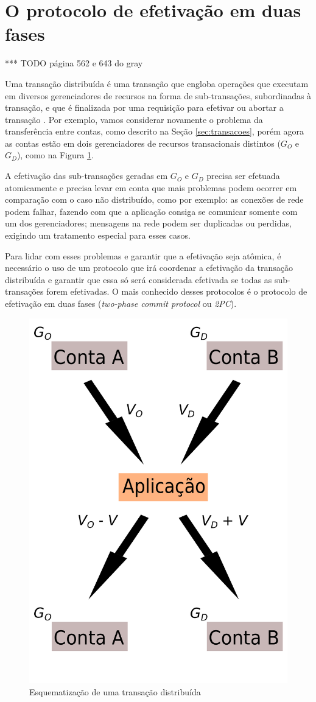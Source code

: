 \documentclass[11pt,twoside,a4paper]{book}
\begin{document}
\section{O protocolo de efetivação em duas fases}
\label{sec:2pc}
*** TODO página 562 e 643 do gray 

Uma transação distribuída é uma transação que engloba operações que executam em diversos gerenciadores de recursos na forma de sub-transações, subordinadas à transação, e que é finalizada por uma requisição para efetivar ou abortar a transação \cite{gray-lamport}. Por exemplo, vamos considerar novamente o problema da transferência entre contas, como descrito na Seção \ref{sec:transacoes}, porém agora as contas estão em dois gerenciadores de recursos transacionais distintos ($G_O$ e $G_D$), como na Figura \ref{fig:transacao_distribuida}.

A efetivação das sub-transações geradas em $G_O$ e $G_D$ precisa ser efetuada atomicamente e precisa levar em conta que mais problemas podem ocorrer em comparação com o caso não distribuído, como por exemplo: as conexões de rede podem falhar, fazendo com que a aplicação consiga se comunicar somente com um dos gerenciadores; mensagens na rede podem ser duplicadas ou perdidas, exigindo um tratamento especial para esses casos.

Para lidar com esses problemas e garantir que a efetivação seja atômica, é necessário o uso de um protocolo que irá coordenar a efetivação da transação distribuída e garantir que essa só será considerada efetivada se todas as sub-transações forem efetivadas. O mais conhecido desses protocolos é o protocolo de efetivação em duas fases (\emph{two-phase commit protocol} ou \emph{2PC}).

\begin{figure}
  \centering
  \includegraphics[width=.40\textwidth]{transacao_distribuida} 
  \caption{Esquematização de uma transação distribuída}
  \label{fig:transacao_distribuida} 
\end{figure}
\end{document}

